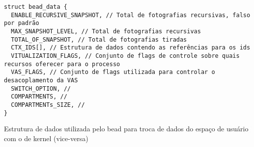 \begin{pseudocode}

\begin{lstlisting}[language=pseudocode, style=pseudocode]
struct bead_data {
  ENABLE_RECURSIVE_SNAPSHOT, // Total de fotografias recursivas, falso por padrão
  MAX_SNAPSHOT_LEVEL, // Total de fotografias recursivas
  TOTAL_OF_SNAPSHOT, // Total de fotografias tiradas
  CTX_IDS[], // Estrutura de dados contendo as referências para os ids
  VITUALIZATION_FLAGS, // Conjunto de flags de controle sobre quais recursos oferecer para o processo
  VAS_FLAGS, // Conjunto de flags utilizada para controlar o desacoplamento da VAS
  SWITCH_OPTION, // 
  COMPARTMENTS, // 
  COMPARTMENTs_SIZE, // 
}

\end{lstlisting}

  \caption{Estrutura de dados utilizada pelo bead para troca de dados do espaço de usuário com o de kernel (vice-versa)}
  \label{alg:beadata}
\end{pseudocode}
